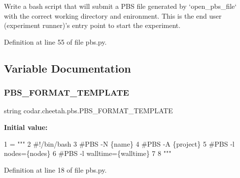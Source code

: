\begin{DoxyVerb}Write a bash script that will submit a PBS file generated by
`open_pbs_file` with the correct working directory and enironment.
This is the end user (experiment runner)'s entry point to start the
experiment.
\end{DoxyVerb}
 

Definition at line 55 of file pbs.\+py.



\subsection{Variable Documentation}
\mbox{\label{namespacecodar_1_1cheetah_1_1pbs_a076dd2388cec6ba878adff6363356c1f}} 
\subsubsection{\texorpdfstring{P\+B\+S\+\_\+\+F\+O\+R\+M\+A\+T\+\_\+\+T\+E\+M\+P\+L\+A\+TE}{PBS\_FORMAT\_TEMPLATE}}
{\footnotesize\ttfamily string codar.\+cheetah.\+pbs.\+P\+B\+S\+\_\+\+F\+O\+R\+M\+A\+T\+\_\+\+T\+E\+M\+P\+L\+A\+TE}

{\bfseries Initial value\+:}
\begin{DoxyCode}
1 =  \textcolor{stringliteral}{"""}
2 \textcolor{stringliteral}{#!/bin/bash}
3 \textcolor{stringliteral}{#PBS -N \{name\}}
4 \textcolor{stringliteral}{#PBS -A \{project\}}
5 \textcolor{stringliteral}{#PBS -l nodes=\{nodes\}}
6 \textcolor{stringliteral}{#PBS -l walltime=\{walltime\}}
7 \textcolor{stringliteral}{}
8 \textcolor{stringliteral}{"""}
\end{DoxyCode}


Definition at line 18 of file pbs.\+py.

\mbox{\label{namespacecodar_1_1cheetah_1_1pbs_a19167ffbdc5b9b468b3368c09ba8fe1f}} 
